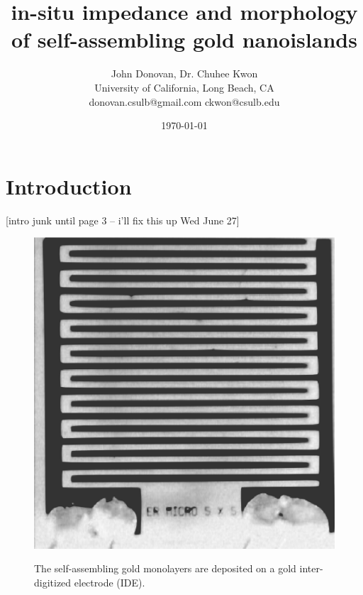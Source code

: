 \documentclass[12pt,oneside,english]{article}
\begin{document}

        \title{in-situ impedance and morphology of self-assembling gold nanoislands}

	\author{John Donovan, Dr. Chuhee Kwon\\
	University of California, Long Beach, CA\\
	{\small donovan.csulb@gmail.com ckwon@csulb.edu}}
	
        \date{\today}

	\maketitle

	\tableofcontents
	

        \section{Introduction}

[intro junk until page 3 -- i'll fix this up Wed June 27]

	\begin{figure}
	\includegraphics[scale=0.4]{images/IDE.eps} \label{f:IDE}
	\caption{The self-assembling gold monolayers are deposited on a gold inter-digitized electrode (IDE).}
	\end{figure}
	
\end{document}
